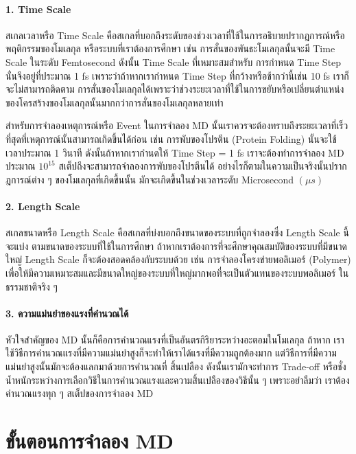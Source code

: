 \paragraph{1. Time Scale} สเกลเวลาหรือ Time Scale คือสเกลที่บอกถึงระดับของช่วงเวลาที่ใช้ในการอธิบายปรากฎการณ์หรือพฤติกรรมของโมเลกุล%
หรือระบบที่เราต้องการศึกษา เช่น การสั่นของพันธะโมเลกุลนั้นจะมี Time Scale ในระดับ Femtosecond ดังนั้น Time Scale ที่เหมาะสมสำหรับ%
การกำหนด Time Step นั่นจึงอยู่ที่ประมาณ 1 fs เพราะว่าถ้าหากเรากำหนด Time Step ที่กว้างหรือช้ากว่านี้เช่น 10 fs เราก็จะไม่สามารถติดตาม%
การสั่นของโมเลกุลได้เพราะว่าช่วงระยะเวลาที่ใช้ในการขยับหรือเปลี่ยนตำแหน่งของโครสร้างของโมเลกุลนั้นมากกว่าการสั่นของโมเลกุลหลายเท่า

สำหรับการจำลองเหตุการณ์หรือ Event ในการจำลอง MD นั้นเราควรจะต้องทราบถึงระยะเวลาที่เร็วที่สุดที่เหตุการณ์นั้นสามารถเกิดขึ้นได้ก่อน เช่น
การพับของโปรตีน (Protein Folding) นั้นจะใช้เวลาประมาณ 1 วินาที ดังนั้นถ้าหากเรากำนดให้ Time Step = 1 fs เราจะต้องทำการจำลอง
MD ประมาณ $10^{15}$ สเต็ปถึงจะสามารถจำลองการพับของโปรตีนได้ อย่างไรก็ตามในความเป็นจริงนั้นปรากฎการณ์ต่าง ๆ ของโมเลกุลที่เกิดขึ้นนั้น%
มักจะเกิดขึ้นในช่วงเวลาระดับ Microsecond $(\mu s)$

\paragraph{2. Length Scale} สเกลขนาดหรือ Length Scale คือสเกลที่บ่งบอกถึงขนาดของระบบที่ถูกจำลองซึ่ง Length Scale นี้จะแบ่ง%
ตามขนาดของระบบที่ใช้ในการศึกษา ถ้าหากเราต้องการที่จะศึกษาคุณสมบัติของระบบที่มีขนาดใหญ่ Length Scale ก็จะต้องสอดคล้องกับระบบด้วย
เช่น การจำลองโครงข่ายพอลิเมอร์ (Polymer) เพื่อให้มีความเหมาะสมและมีขนาดใหญ่ของระบบที่ใหญ่มากพอที่จะเป็นตัวแทนของระบบพอลิเมอร์%
ในธรรมชาติจริง ๆ

\paragraph{3. ความแม่นยำของแรงที่คำนวณได้} หัวใจสำคัญของ MD นั้นก็คือการคำนวณแรงที่เป็นอันตรกิริยาระหว่างอะตอมในโมเลกุล ถ้าหาก%
เราใช้วิธีการคำนวณแรงที่มีความแม่นยำสูงก็จะทำให้เราได้แรงที่มีความถูกต้องมาก แต่วิธีการที่มีความแม่นยำสูงนั้นมักจะต้องแลกมาด้วยการคำนวณที่%
สิ้นเปลือง ดังนั้นเรามักจะทำการ Trade-off หรือชั่งน้ำหนักระหว่างการเลือกวิธีในการคำนวณแรงและความสิ้นเปลืองของวิธีนั้น ๆ เพราะอย่าลืมว่า%
เราต้องคำนวณแรงทุก ๆ สเต็ปของการจำลอง MD

\section{ขั้นตอนการจำลอง MD}

